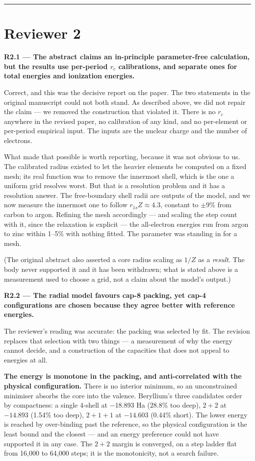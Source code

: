 \documentclass[11pt,a4paper]{article}
\begin{document}
\medskip\hrule\medskip

\section*{Reviewer 2}

\textbf{R2.1 --- The abstract claims an in-principle parameter-free calculation, but the results use
per-period $r_c$ calibrations, and separate ones for total energies and ionization energies.}

Correct, and this was the decisive report on the paper. The two statements in the original
manuscript could not both stand. As described above, we did not repair the claim --- we removed
the construction that violated it. There is no $r_c$ anywhere in the revised paper, no
calibration of any kind, and no per-element or per-period empirical input. The inputs are the
nuclear charge and the number of electrons.

What made that possible is worth reporting, because it was not obvious to us. The calibrated
radius existed to let the heavier elements be computed on a fixed mesh; its real function was
to remove the innermost shell, which is the one a uniform grid resolves worst. But that is a
resolution problem and it has a resolution answer. The free-boundary shell radii are outputs of
the model, and we now measure the innermost one to follow $r_{1s}Z \approx 4.3$, constant to
$\pm9\%$ from carbon to argon. Refining the mesh accordingly --- and scaling the step count with
it, since the relaxation is explicit --- the all-electron energies run from argon to zinc within
1--5\% with nothing fitted. The parameter was standing in for a mesh.

(The original abstract also asserted a core radius scaling as $1/Z$ as a \emph{result}. The body
never supported it and it has been withdrawn; what is stated above is a measurement used to
choose a grid, not a claim about the model's output.)

\textbf{R2.2 --- The radial model favours cap-8 packing, yet cap-4 configurations are chosen because
they agree better with reference energies.}

The reviewer's reading was accurate: the packing was selected by fit. The revision replaces that
selection with two things --- a measurement of why the energy cannot decide, and a construction of the
capacities that does not appeal to energies at all.

\textbf{The energy is monotone in the packing, and anti-correlated with the physical configuration.} There
is no interior minimum, so an unconstrained minimiser absorbs the core into the valence. Beryllium's
three candidates order by compactness: a single 4-shell at $-18.893$ Ha (28.8\% too deep), $2{+}2$ at
$-14.893$ (1.54\% too deep), $2{+}1{+}1$ at $-14.603$ (0.44\% short). The lower energy is reached by
over-binding past the reference, so the physical configuration is the least bound and the closest ---
and an energy preference could not have supported it in any case. The $2{+}2$ margin is converged, on
a step ladder flat from 16,000 to 64,000 steps; it is the monotonicity, not a search failure.
\end{document}
